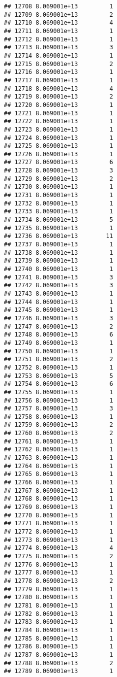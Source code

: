 \documentclass[
]{article}
\begin{document}
\begin{verbatim}
## 12708 8.069001e+13         1
## 12709 8.069001e+13         2
## 12710 8.069001e+13         4
## 12711 8.069001e+13         1
## 12712 8.069001e+13         1
## 12713 8.069001e+13         3
## 12714 8.069001e+13         1
## 12715 8.069001e+13         2
## 12716 8.069001e+13         1
## 12717 8.069001e+13         1
## 12718 8.069001e+13         4
## 12719 8.069001e+13         2
## 12720 8.069001e+13         1
## 12721 8.069001e+13         1
## 12722 8.069001e+13         1
## 12723 8.069001e+13         1
## 12724 8.069001e+13         1
## 12725 8.069001e+13         1
## 12726 8.069001e+13         1
## 12727 8.069001e+13         6
## 12728 8.069001e+13         3
## 12729 8.069001e+13         2
## 12730 8.069001e+13         1
## 12731 8.069001e+13         1
## 12732 8.069001e+13         1
## 12733 8.069001e+13         1
## 12734 8.069001e+13         5
## 12735 8.069001e+13         1
## 12736 8.069001e+13        11
## 12737 8.069001e+13         1
## 12738 8.069001e+13         1
## 12739 8.069001e+13         1
## 12740 8.069001e+13         1
## 12741 8.069001e+13         3
## 12742 8.069001e+13         3
## 12743 8.069001e+13         1
## 12744 8.069001e+13         1
## 12745 8.069001e+13         1
## 12746 8.069001e+13         3
## 12747 8.069001e+13         2
## 12748 8.069001e+13         6
## 12749 8.069001e+13         1
## 12750 8.069001e+13         1
## 12751 8.069001e+13         2
## 12752 8.069001e+13         1
## 12753 8.069001e+13         5
## 12754 8.069001e+13         6
## 12755 8.069001e+13         1
## 12756 8.069001e+13         1
## 12757 8.069001e+13         3
## 12758 8.069001e+13         1
## 12759 8.069001e+13         2
## 12760 8.069001e+13         2
## 12761 8.069001e+13         1
## 12762 8.069001e+13         1
## 12763 8.069001e+13         1
## 12764 8.069001e+13         1
## 12765 8.069001e+13         1
## 12766 8.069001e+13         1
## 12767 8.069001e+13         1
## 12768 8.069001e+13         1
## 12769 8.069001e+13         1
## 12770 8.069001e+13         1
## 12771 8.069001e+13         1
## 12772 8.069001e+13         1
## 12773 8.069001e+13         1
## 12774 8.069001e+13         4
## 12775 8.069001e+13         2
## 12776 8.069001e+13         1
## 12777 8.069001e+13         1
## 12778 8.069001e+13         2
## 12779 8.069001e+13         1
## 12780 8.069001e+13         1
## 12781 8.069001e+13         1
## 12782 8.069001e+13         1
## 12783 8.069001e+13         1
## 12784 8.069001e+13         1
## 12785 8.069001e+13         1
## 12786 8.069001e+13         1
## 12787 8.069001e+13         1
## 12788 8.069001e+13         2
## 12789 8.069001e+13         1

\end{verbatim}
\end{document}
